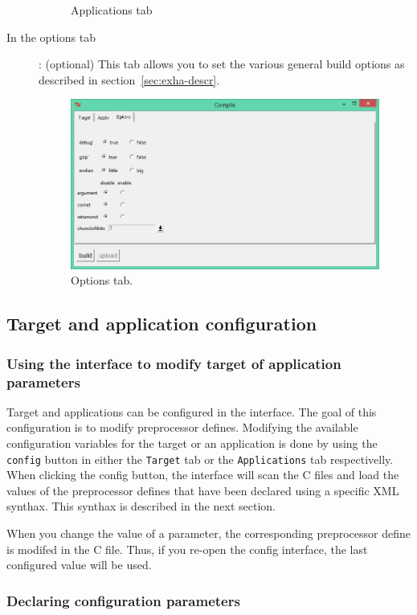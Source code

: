 \documentclass{report}
\begin{document}
\begin{description}
\begin{figure}[H]
\caption{Applications tab}
\end{figure}
\item[In the options tab]: (optional) This tab allows you to set the various
  general build options as described in section~\ref{sec:exha-descr}.
\begin{figure}[H]
\centering
\includegraphics[scale=0.7]{OptionsUI}
\caption{Options tab.}
\end{figure}


\end{description}
\subsection{Target and application configuration}

\subsubsection{Using the interface to modify target of application parameters}
Target and applications can be configured in the interface. The goal of this
configuration is to modify preprocessor defines. Modifying the available
configuration variables for the target or an application is done by using the
\verb!config! button in either the \verb!Target! tab or the \verb!Applications!
tab respectivelly. When clicking the config button, the interface will scan the
C files and load the values of the preprocessor defines that have been declared using
a specific XML synthax. This synthax is described in the next section.

When you change the value of a parameter, the corresponding preprocessor define
is modifed in the C file. Thus, if you re-open the config interface, the last
configured value will be used.

\subsubsection{Declaring configuration parameters}
\end{document}
